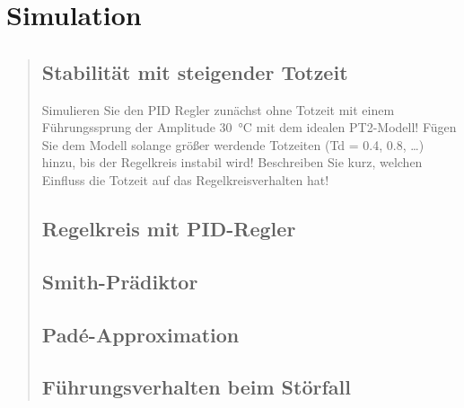 \section{Simulation}
\begin{quote}
    
    \subsection{Stabilität mit steigender Totzeit}
    Simulieren Sie den PID Regler zunächst ohne Totzeit mit einem Führungssprung der Amplitude
    \SI{+30}{\celsius} mit dem idealen PT2-Modell! Fügen Sie dem Modell solange größer werdende Totzeiten (Td = 0.4,
    0.8, \ldots) hinzu, bis der Regelkreis instabil wird! Beschreiben Sie kurz, welchen Einﬂuss die Totzeit auf das
    Regelkreisverhalten hat!
    \begin{quote}
        
    \end{quote}
    
    
    \subsection{Regelkreis mit PID-Regler}
    \begin{quote}
        
    \end{quote}
    
    
    \subsection{Smith-Prädiktor}
    \begin{quote}
        
    \end{quote}
    
    
    \subsection{Pad\'e-Approximation}
    \begin{quote}
        
    \end{quote}
    
    
    \subsection{Führungsverhalten beim Störfall}
    \begin{quote}
        
    \end{quote}
    
    
    
\end{quote}



